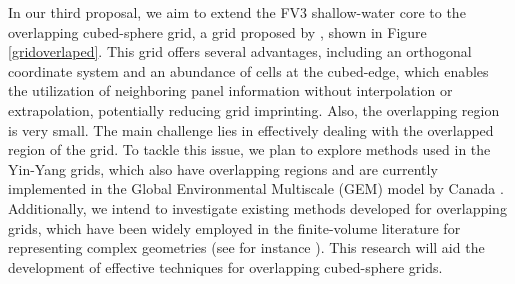 In our third proposal, we aim to extend the FV3 shallow-water core to the overlapping cubed-sphere grid, a grid proposed by \citet{purser:2017}, shown in Figure \ref{gridoverlaped}.
This grid offers several advantages, including an orthogonal coordinate system and an abundance of cells at the cubed-edge,
which enables the utilization of neighboring panel information without interpolation or extrapolation, potentially reducing grid imprinting.
Also, the overlapping region is very small.
The main challenge lies in effectively dealing with the overlapped region of the grid. To tackle this issue, we plan to explore methods used in the Yin-Yang grids, which also have overlapping regions and are currently implemented in the Global Environmental Multiscale (GEM) model by Canada \citep{qaddouri:2011,husain:2019}.
Additionally, we intend to investigate existing methods developed for overlapping grids, which have been widely employed in the finite-volume literature for representing complex geometries
(see for instance \citet{hadzic:2005}).
This research will aid the development of effective techniques for overlapping cubed-sphere grids.